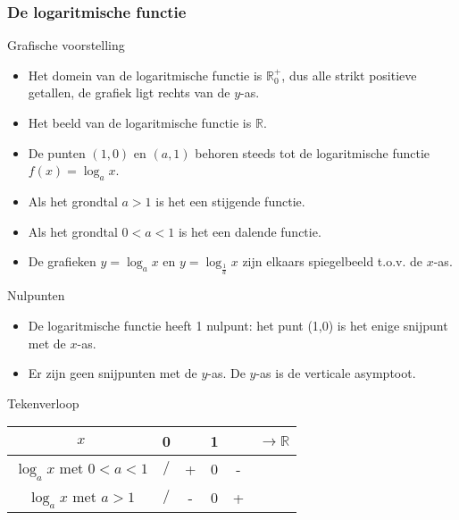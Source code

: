 \subsubsection{De logaritmische functie}

Grafische voorstelling


\begin{itemize}
	\item Het domein van de logaritmische functie is $\mathbb{R}_{0}^{+}$,
	dus alle strikt positieve getallen, de grafiek ligt rechts van de
	$y$-as.
	\item Het beeld van de logaritmische functie is $\mathbb{R}$.
	\item De punten $(1,0)$ en $(a,1)$ behoren steeds tot de logaritmische
	functie $f(x)=\log_{a}x$.
	\item Als het grondtal $a>1$ is het een stijgende functie.
	\item Als het grondtal $0<a<1$ is het een dalende functie.
	\item De grafieken $y=\log_{a}x$ en $y=\log_{\frac{1}{a}}x$
	zijn elkaars spiegelbeeld t.o.v. de $x$-as.
\end{itemize}

Nulpunten

\begin{itemize}
	\item De logaritmische functie heeft 1 nulpunt: het punt (1,0) is het enige
	snijpunt met de $x$-as. 
	\item Er zijn geen snijpunten met de $y$-as. De $y$-as is de verticale asymptoot.
\end{itemize}

Tekenverloop

\begin{tabel}{}
\begin{tabular}{c|ccccc}
	$x$ & 0 &  & 1 &  & $\longrightarrow\mathbb{R}$\\
	\hline 
	$\log_{a}x$ met $0<a<1$ & $/$ & + & 0 & - & \multicolumn{1}{c|}{}\\
	$\log_{a}x$ met $a>1$ & $/$ & - & 0 & + & \multicolumn{1}{c|}{}\\
\end{tabular}
\end{tabel}



